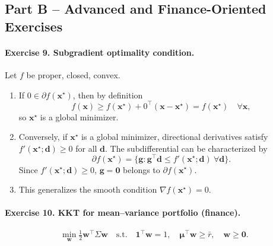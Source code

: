 \documentclass[11pt]{article}
\begin{document}
\bigskip
\bigskip

\subsection*{Part B -- Advanced and Finance-Oriented Exercises}

\paragraph{Exercise 9. Subgradient optimality condition.}

Let $f$ be proper, closed, convex.

\begin{enumerate}
\item If $0\in\partial f(\bm{x}^\star)$, then by definition
\[
f(\bm{x}) \ge f(\bm{x}^\star) + 0^\top(\bm{x}-\bm{x}^\star)
= f(\bm{x}^\star) \quad \forall \bm{x},
\]
so $\bm{x}^\star$ is a global minimizer.

\item Conversely, if $\bm{x}^\star$ is a global minimizer, directional derivatives satisfy $f'(\bm{x}^\star;\bm{d})\ge 0$ for all $\bm{d}$.  
The subdifferential can be characterized by
\[
\partial f(\bm{x}^\star)
= \{\bm{g}: \bm{g}^\top\bm{d} \le f'(\bm{x}^\star;\bm{d}) \ \forall \bm{d}\}.
\]
Since $f'(\bm{x}^\star;\bm{d})\ge 0$, $\bm{g}=\bm{0}$ belongs to $\partial f(\bm{x}^\star)$.

\item This generalizes the smooth condition $\nabla f(\bm{x}^\star)=0$.
\end{enumerate}

\bigskip

\paragraph{Exercise 10. KKT for mean--variance portfolio (finance).}

\[
\min_{\bm{w}} \tfrac12 \bm{w}^\top\Sigma\bm{w}
\quad\text{s.t.}\quad
\bm{1}^\top\bm{w}=1,\quad
\bm{\mu}^\top\bm{w}\ge\bar{r},\quad
\bm{w}\ge\bm{0}.
\]
\end{document}
